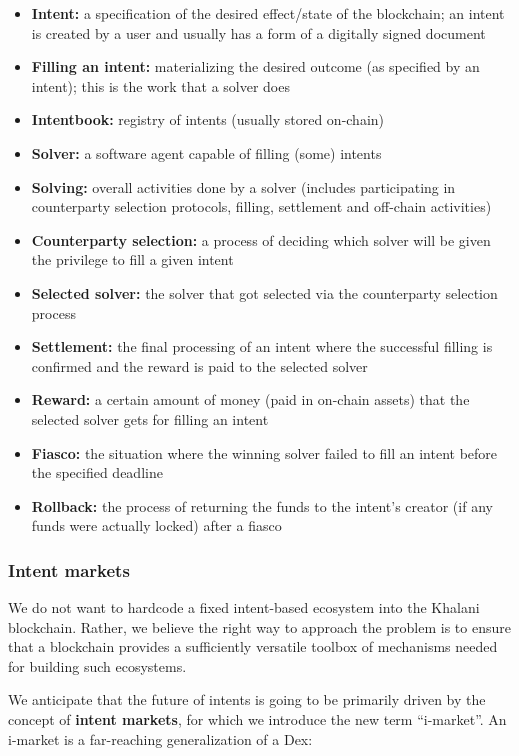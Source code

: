 \documentclass[a4paper]{article}
\begin{document}
\begin{itemize}
  \item \textbf{Intent:} a specification of the desired effect/state of the blockchain; an intent is created by a user and usually has a form of a digitally signed document
  \item \textbf{Filling an intent:} materializing the desired outcome (as specified by an intent); this is the work that a solver does
  \item \textbf{Intentbook:} registry of intents (usually stored on-chain)
  \item \textbf{Solver:} a software agent capable of filling (some) intents
  \item \textbf{Solving:} overall activities done by a solver (includes participating in counterparty selection protocols, filling, settlement and off-chain activities)
  \item \textbf{Counterparty selection:} a process of deciding which solver will be given the privilege to fill a given intent
  \item \textbf{Selected solver:} the solver that got selected via the counterparty selection process
  \item \textbf{Settlement:} the final processing of an intent where the successful filling is confirmed and the reward is paid to the selected solver
  \item \textbf{Reward:} a certain amount of money (paid in on-chain assets) that the selected solver gets for filling an intent
  \item \textbf{Fiasco:} the situation where the winning solver failed to fill an intent before the specified deadline
  \item \textbf{Rollback:} the process of returning the funds to the intent's creator (if any funds were actually locked) after a fiasco
\end{itemize}

\subsubsection{Intent markets}

We do not want to hardcode a fixed intent-based ecosystem into the Khalani blockchain. Rather, we believe the right way to approach the problem is to ensure that a blockchain provides a sufficiently versatile toolbox of mechanisms needed for building such ecosystems.

We anticipate that the future of intents is going to be primarily driven by the concept of \textbf{intent markets}, for which we introduce the new term ``i-market''. An i-market is a far-reaching generalization of a Dex:
\end{document}
